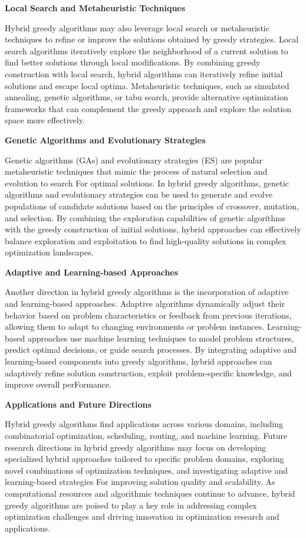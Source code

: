 \documentclass[12pt]{book} %
\begin{document}
\textbf{Local Search and Metaheuristic Techniques}

Hybrid greedy algorithms may also leverage local search or metaheuristic techniques to refine or improve the solutions obtained by greedy strategies. Local search algorithms iteratively explore the neighborhood of a current solution to find better solutions through local modifications. By combining greedy construction with local search, hybrid algorithms can iteratively refine initial solutions and escape local optima. Metaheuristic techniques, such as simulated annealing, genetic algorithms, or tabu search, provide alternative optimization frameworks that can complement the greedy approach and explore the solution space more effectively.

\textbf{Genetic Algorithms and Evolutionary Strategies}

Genetic algorithms (GAs) and evolutionary strategies (ES) are popular metaheuristic techniques that mimic the process of natural selection and evolution to search For optimal solutions. In hybrid greedy algorithms, genetic algorithms and evolutionary strategies can be used to generate and evolve populations of candidate solutions based on the principles of crossover, mutation, and selection. By combining the exploration capabilities of genetic algorithms with the greedy construction of initial solutions, hybrid approaches can effectively balance exploration and exploitation to find high-quality solutions in complex optimization landscapes.

\textbf{Adaptive and Learning-based Approaches}

Another direction in hybrid greedy algorithms is the incorporation of adaptive and learning-based approaches. Adaptive algorithms dynamically adjust their behavior based on problem characteristics or feedback from previous iterations, allowing them to adapt to changing environments or problem instances. Learning-based approaches use machine learning techniques to model problem structures, predict optimal decisions, or guide search processes. By integrating adaptive and learning-based components into greedy algorithms, hybrid approaches can adaptively refine solution construction, exploit problem-specific knowledge, and improve overall perFormance.

\textbf{Applications and Future Directions}

Hybrid greedy algorithms find applications across various domains, including combinatorial optimization, scheduling, routing, and machine learning. Future research directions in hybrid greedy algorithms may focus on developing specialized hybrid approaches tailored to specific problem domains, exploring novel combinations of optimization techniques, and investigating adaptive and learning-based strategies For improving solution quality and scalability. As computational resources and algorithmic techniques continue to advance, hybrid greedy algorithms are poised to play a key role in addressing complex optimization challenges and driving innovation in optimization research and applications.
\end{document}
